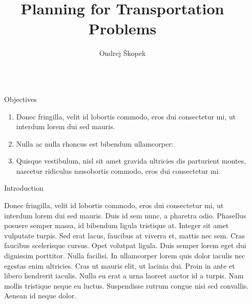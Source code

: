 \documentclass[final,hyperref={pdfpagelabels=false}]{beamer}
\title{\huge Planning for Transportation Problems} %
\author{Ondrej \v{S}kopek} %
\institute{Faculty of Mathematics and Physics, Charles University} %
\begin{document}

\begin{frame}[t] %

\begin{columns}[t] %

\begin{column}{.02\textwidth}\end{column} %

\begin{column}{.465\textwidth} %


\begin{block}{Objectives}

\begin{enumerate}
\item Donec fringilla, velit id lobortis commodo, eros dui consectetur mi, ut interdum lorem dui sed mauris.
\item Nulla ac nulla rhoncus est bibendum ullamcorper:
\item Quisque vestibulum, nisl sit amet gravida ultricies dis parturient montes, nascetur ridiculus musobortis commodo, eros dui consectetur mi.
\end{enumerate}

\end{block}

            
\begin{block}{Introduction}

Donec fringilla, velit id lobortis commodo, eros dui consectetur mi, ut interdum lorem dui sed mauris. Duis id sem nunc, a pharetra odio. Phasellus posuere \alert{semper massa}, id bibendum ligula tristique at. Integer sit amet vulputate turpis. Sed erat lacus, faucibus at viverra et, mattis nec sem. Cras faucibus \alert{scelerisque} cursus. Opet volutpat ligula. Duis semper lorem eget dui dignissim porttitor. Nulla facilisi. In ullamcorper lorem quis dolor iaculis nec egestas enim ultricies. Cras ut mauris elit, ut lacinia dui. Proin in ante et libero hendrerit iaculis. Nulla eu erat a urna laoreet auctor id a turpis. Nam mollis tristique neque eu luctus. Suspendisse rutrum congue nisi sed convallis. Aenean id neque dolor.


\end{block}
\end{column}
\end{columns}
\end{frame}
\end{document}
